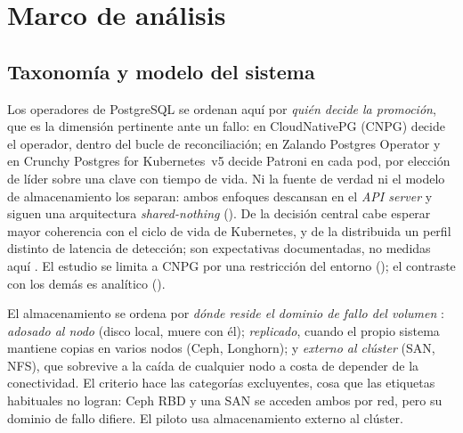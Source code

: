 \section{Marco de análisis}\label{sec:marco}
\subsection{Taxonomía y modelo del sistema}\label{sec:taxo}
Los operadores de PostgreSQL se ordenan aquí por \emph{quién decide la promoción}, que es la dimensión pertinente ante un fallo: en CloudNativePG (CNPG) decide el operador, dentro del bucle de reconciliación; en Zalando Postgres Operator y en Crunchy Postgres for Kubernetes~v5 decide Patroni en cada pod, por elección de líder sobre una clave con tiempo de vida. Ni la fuente de verdad ni el modelo de almacenamiento los separan: ambos enfoques descansan en el \textit{API server} y siguen una arquitectura \textit{shared-nothing} (). De la decisión central cabe esperar mayor coherencia con el ciclo de vida de Kubernetes, y de la distribuida un perfil distinto de latencia de detección; son expectativas documentadas, no medidas aquí \citep{dobies2020,k8s2026operator}. El estudio se limita a CNPG por una restricción del entorno (); el contraste con los demás es analítico ().

El almacenamiento se ordena por \emph{dónde reside el dominio de fallo del volumen} \citep{k8s2024csi}: \textit{adosado al nodo} (disco local, muere con él); \textit{replicado}, cuando el propio sistema mantiene copias en varios nodos (Ceph, Longhorn); y \textit{externo al clúster} (SAN, NFS), que sobrevive a la caída de cualquier nodo a costa de depender de la conectividad. El criterio hace las categorías excluyentes, cosa que las etiquetas habituales no logran: Ceph RBD y una SAN se acceden ambos por red, pero su dominio de fallo difiere. El piloto usa almacenamiento externo al clúster.

